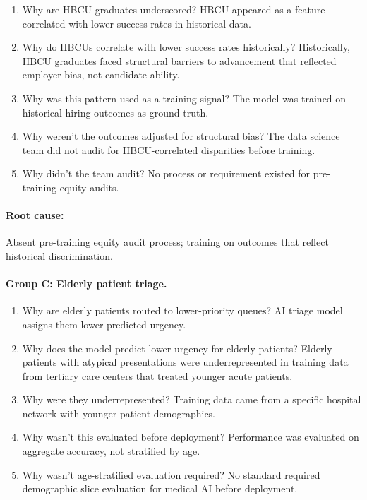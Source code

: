 \begin{enumerate}
    \item Why are HBCU graduates underscored? HBCU appeared as a feature correlated with lower success rates in historical data.
    \item Why do HBCUs correlate with lower success rates historically? Historically, HBCU graduates faced structural barriers to advancement that reflected employer bias, not candidate ability.
    \item Why was this pattern used as a training signal? The model was trained on historical hiring outcomes as ground truth.
    \item Why weren't the outcomes adjusted for structural bias? The data science team did not audit for HBCU-correlated disparities before training.
    \item Why didn't the team audit? No process or requirement existed for pre-training equity audits.
\end{enumerate}

\paragraph{Root cause:} Absent pre-training equity audit process; training on outcomes that reflect historical discrimination.

\paragraph{Group C: Elderly patient triage.}

\begin{enumerate}
    \item Why are elderly patients routed to lower-priority queues? AI triage model assigns them lower predicted urgency.
    \item Why does the model predict lower urgency for elderly patients? Elderly patients with atypical presentations were underrepresented in training data from tertiary care centers that treated younger acute patients.
    \item Why were they underrepresented? Training data came from a specific hospital network with younger patient demographics.
    \item Why wasn't this evaluated before deployment? Performance was evaluated on aggregate accuracy, not stratified by age.
    \item Why wasn't age-stratified evaluation required? No standard required demographic slice evaluation for medical AI before deployment.
\end{enumerate}

